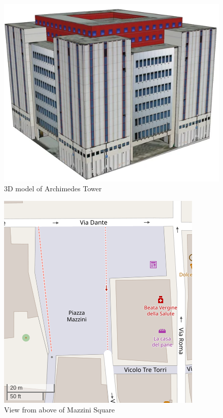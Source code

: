 	\begin{minipage}{0.5\textwidth}%
		\begin{figure}[H]
			\centering
			\includegraphics[width=\textwidth]{resources/img/chap5/archimede_1}
			\caption{3D model of Archimedes Tower}
			\label{img:archimede_1}
		\end{figure}
	\end{minipage}%
	\hfill%
	\begin{minipage}{0.5\textwidth}\raggedright
		\begin{figure}[H]
			\centering
			\includegraphics[width=.8\textwidth]{resources/img/chap5/pzza_mazzini_1}
			\caption{View from above of Mazzini Square}
			\label{img:pzza_mazzini_1}
		\end{figure}
	\end{minipage}%
	
